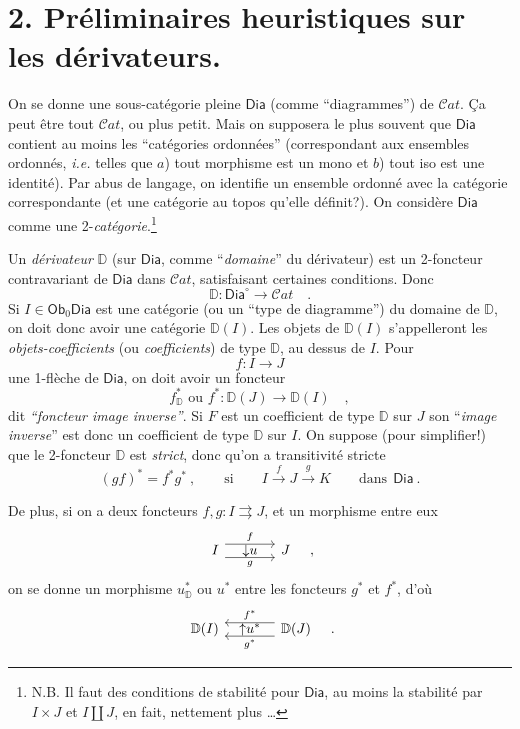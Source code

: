 \documentclass[11pt]{article}
\newcommand{\printedpage}[1]{\marginpar{\footnotesize p.~#1}}
\newcommand{\msp}[1]{\marginpar{\footnotesize [#1]}}
\newcommand{\Ob}{\mathsf{Ob}}
\newcommand{\Dia}{\mathsf{Dia}}
\newcommand{\Cat}{\mathcal{C}\mathit{at}}
\newcommand{\DD}{\mathbb{D}}
\begin{document}
\printedpage{4}

\msp{page 4}

\section*{2. Préliminaires heuristiques sur les dérivateurs.}

On se donne une sous-catégorie pleine $\Dia$ (comme “diagrammes”) de $\Cat$. Ça peut être tout $\Cat$, ou plus petit. Mais on supposera le plus souvent que $\Dia$ contient au moins les “catégories ordonnées” (correspondant aux ensembles ordonnés, \textit{i.e.} telles que $a$) tout morphisme est un mono et $b$) tout iso est une identité). Par abus de langage, on identifie un ensemble ordonné avec la catégorie correspondante (et une catégorie au topos qu'elle définit?). On considère $\Dia$ comme une 2-\textit{catégorie}.\footnote{N.B. Il faut des conditions de stabilité pour $\Dia$, au moins la stabilité par $I \times J$ et $I \amalg J$, en fait, nettement plus \dots}

Un \textit{dérivateur} $\DD$ (sur $\Dia$, comme “\textit{domaine}” du dérivateur) est un 2-foncteur contravariant de $\Dia$ dans $\Cat$, satisfaisant certaines conditions. Donc
\[ \DD : \Dia^{\circ} \longrightarrow \Cat \quad . \]
Si $I \in \Ob_0 \Dia$ est une catégorie (ou un “type de diagramme”) du domaine de $\DD$, on doit donc avoir une catégorie $\DD(I)$. Les objets de $\DD(I)$ s'appelleront les \textit{objets-coefficients} (ou \textit{coefficients}) de type $\DD$, au dessus de $I$. Pour
\[ f : I \longrightarrow J \]
une 1-flèche de $\Dia$, on doit avoir un foncteur
\[ f^*_{\DD} \text{ ou } f^* : \DD(J) \longrightarrow \DD(I) \quad , \]
dit \textit{“foncteur image inverse”}. Si $F$ est un coefficient de type $\DD$ sur $J$ son “\textit{image inverse}” est donc un coefficient de type $\DD$ sur $I$. On suppose (pour simplifier!) que le 2-foncteur $\DD$ est \textit{strict}, donc qu'on a transitivité stricte
\[ (gf)^* = f^*g^* \ , \qquad \text{si} \qquad I \xrightarrow{f} J \xrightarrow{g} K \qquad \text{dans} \ \ \Dia \ . \]

\msp{page 5}

De plus, si on a deux foncteurs $f, g : I \rightrightarrows J$, et un morphisme entre eux
\[
\begin{tikzcd}[column sep=large]
I \arrow[r, shift left=2, "f"] \arrow[r, shift right=2, "g"'] \arrow[r, phantom, "{\downarrow}u"] & J
\end{tikzcd}
\quad ,
\]
on se donne un morphisme $u^*_{\DD}$ ou $u^*$ entre les foncteurs $g^*$ et $f^*$, d'où
\[
\begin{tikzcd}[column sep=large]
\DD(I) & \DD(J) \arrow[l, shift right=2, "f^*"'] \arrow[l, shift left=2, "g^*"] \arrow[l, phantom, "{\uparrow}u^*"]
\end{tikzcd}
\quad .
\]
\end{document}
